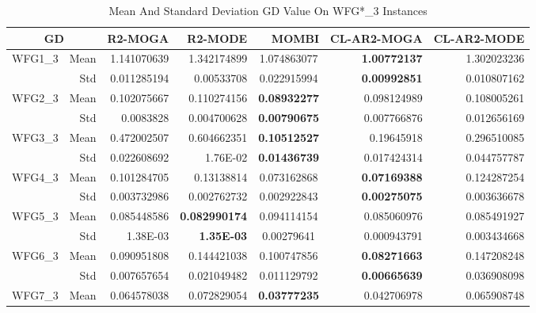 \begin{table*}[htbp]
  \centering
  \caption{Mean And Standard Deviation GD Value On WFG*\_3 Instances}
    \begin{tabular}{rrrrrrr}
    \toprule
    \multicolumn{2}{c}{GD} & R2-MOGA & R2-MODE & MOMBI & CL-AR2-MOGA & CL-AR2-MODE \\
    \midrule
    \multirow{2}[0]{*}{WFG1\_3} & Mean  & 1.141070639 & 1.342174899 & \multicolumn{1}{c}{1.074863077} & \textbf{1.00772137} & 1.302023236 \\
          & Std   & 0.011285194 & 0.00533708 & \multicolumn{1}{c}{0.022915994} & \textbf{0.00992851} & 0.010807162 \\
    \multirow{2}[0]{*}{WFG2\_3} & Mean  & 0.102075667 & 0.110274156 & \multicolumn{1}{c}{\textbf{0.08932277}} & 0.098124989 & 0.108005261 \\
          & Std   & 0.0083828 & 0.004700628 & \multicolumn{1}{c}{\textbf{0.00790675}} & 0.007766876 & 0.012656169 \\
    \multirow{2}[0]{*}{WFG3\_3} & Mean  & 0.472002507 & 0.604662351 & \multicolumn{1}{c}{\textbf{0.10512527}} & 0.19645918 & 0.296510085 \\
          & Std   & 0.022608692 & 1.76E-02 & \multicolumn{1}{c}{\textbf{0.01436739}} & 0.017424314 & 0.044757787 \\
    \multirow{2}[0]{*}{WFG4\_3} & Mean  & 0.101284705 & 0.13138814 & \multicolumn{1}{c}{0.073162868} & \textbf{0.07169388} & 0.124287254 \\
          & Std   & 0.003732986 & 0.002762732 & \multicolumn{1}{c}{0.002922843} & \textbf{0.00275075} & 0.003636678 \\
    \multirow{2}[0]{*}{WFG5\_3} & Mean  & 0.085448586 & \textbf{0.082990174} & \multicolumn{1}{c}{0.094114154} & 0.085060976 & 0.085491927 \\
          & Std   & 1.38E-03 & \textbf{1.35E-03} & \multicolumn{1}{c}{0.00279641} & 0.000943791 & 0.003434668 \\
    \multirow{2}[0]{*}{WFG6\_3} & Mean  & 0.090951808 & 0.144421038 & \multicolumn{1}{c}{0.100747856} & \textbf{0.08271663} & 0.147208248 \\
          & Std   & 0.007657654 & 0.021049482 & \multicolumn{1}{c}{0.011129792} & \textbf{0.00665639} & 0.036908098 \\
    \multirow{2}[0]{*}{WFG7\_3} & Mean  & 0.064578038 & 0.072829054 & \multicolumn{1}{c}{\textbf{0.03777235}} & 0.042706978 & 0.065908748 \\

\end{tabular}
\end{table*}
